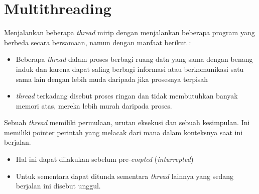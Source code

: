 \section{Multithreading}
\hspace*{0.5in} Menjalankan beberapa\textit{ thread} mirip dengan menjalankan beberapa program yang berbeda secara bersamaan, namun dengan manfaat berikut : \par

\begin{itemize}
\item Beberapa \textit{thread} dalam proses berbagi ruang data yang sama dengan benang induk dan karena dapat saling berbagi informasi atau berkomunikasi satu sama lain dengan lebih muda daripada jika prosesnya terpisah \par

\item \textit{thread} terkadang disebut proses ringan dan tidak membutuhkan banyak memori atas, mereka lebih murah daripada proses.\end{itemize}
\par

\vspace{12pt}
\hspace*{0.5in} Sebuah \textit{thread} memiliki permulaan, urutan eksekusi dan sebuah kesimpulan. Ini memiliki pointer perintah yang melacak dari mana dalam konteksnya saat ini berjalan. \par

\begin{itemize}
\item Hal ini dapat dilakukan sebelum pre-\textit{empted} (\textit{inturrepted})\end{itemize}
\par
\noindent 
\begin{itemize}
\item Untuk sementara dapat ditunda sementara \textit{thread} lainnya yang sedang berjalan ini disebut unggul. \end{itemize}
\par
\noindent 
